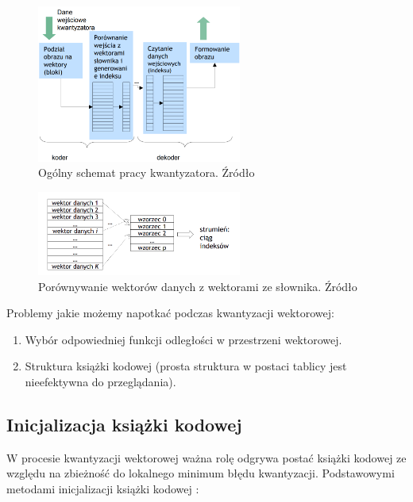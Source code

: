 \documentclass{article}
\begin{document}
\begin{figure}[H]
    \centering
    \includegraphics[width=0.6\textwidth]{images/schemat_kwantyzatora.png}
    \caption{Ogólny schemat pracy kwantyzatora. Źródło \cite{mwilczewski}}
    \label{fig:crossing}
\end{figure}

\begin{figure}[H]
    \centering
    \includegraphics[width=0.6\textwidth]{images/wektory_danych.png}
    \caption{Porównywanie wektorów danych z wektorami ze słownika. Źródło \cite{mwilczewski}}
    \label{fig:crossing}
\end{figure}

Problemy jakie możemy napotkać podczas kwantyzacji wektorowej:
\begin{enumerate}
  \item Wybór odpowiedniej funkcji odległości w przestrzeni wektorowej.  
  \item Struktura książki kodowej (prosta struktura w postaci tablicy jest nieefektywna do przeglądania).
\end{enumerate}

\subsection{Inicjalizacja książki kodowej}

W procesie kwantyzacji wektorowej ważna rolę odgrywa postać książki kodowej ze względu na zbieżność do lokalnego minimum błędu kwantyzacji. Podstawowymi metodami inicjalizacji książki kodowej :
\end{document}
